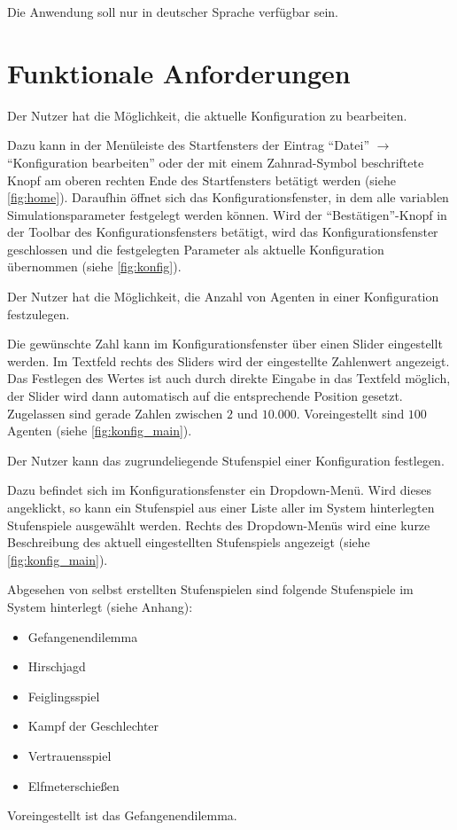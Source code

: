 \documentclass[parskip=full,11pt]{scrartcl}
\begin{document}
Die Anwendung soll nur in deutscher Sprache verfügbar sein.

\pagebreak

\section{Funktionale Anforderungen}

Der \Gls{Nutzer} hat die Möglichkeit, die aktuelle Konfiguration zu bearbeiten.

Dazu kann in der Menüleiste des Startfensters der Eintrag \enquote{Datei} \(\rightarrow\) \enquote{Konfiguration bearbeiten} oder der mit einem Zahnrad-Symbol beschriftete Knopf am oberen rechten Ende des Startfensters betätigt werden (siehe \cref{fig:home}). Daraufhin öffnet sich das Konfigurationsfenster, in dem alle variablen Simulationsparameter festgelegt werden können. Wird der \enquote{Bestätigen}-Knopf in der Toolbar des Konfigurationsfensters betätigt, wird das Konfigurationsfenster geschlossen und die festgelegten Parameter als aktuelle Konfiguration übernommen (siehe \cref{fig:konfig}).

Der \Gls{Nutzer} hat die Möglichkeit, die Anzahl von Agenten in einer Konfiguration festzulegen.

Die gewünschte Zahl kann im Konfigurationsfenster über einen Slider eingestellt werden. Im Textfeld rechts des Sliders wird der eingestellte Zahlenwert angezeigt. Das Festlegen des Wertes ist auch durch direkte Eingabe in das Textfeld möglich, der Slider wird dann automatisch auf die entsprechende Position gesetzt. Zugelassen sind gerade Zahlen zwischen \(2\) und \(10.000\). Voreingestellt sind \(100\) Agenten (siehe \cref{fig:konfig_main}).

Der \Gls{Nutzer} kann das zugrundeliegende Stufenspiel einer Konfiguration festlegen.

Dazu befindet sich im Konfigurationsfenster ein Dropdown-Menü. Wird dieses angeklickt, so kann ein Stufenspiel aus einer Liste aller im System hinterlegten Stufenspiele ausgewählt werden. Rechts des Dropdown-Menüs wird eine kurze Beschreibung des aktuell eingestellten Stufenspiels angezeigt (siehe \cref{fig:konfig_main}).

Abgesehen von selbst erstellten Stufenspielen sind folgende Stufenspiele im System hinterlegt (siehe Anhang):
\begin{itemize} \itemsep -10pt
\item Gefangenendilemma
\item Hirschjagd
\item Feiglingsspiel
\item Kampf der Geschlechter
\item Vertrauensspiel
\item Elfmeterschießen
\end{itemize}
Voreingestellt ist das Gefangenendilemma.
\end{document}
